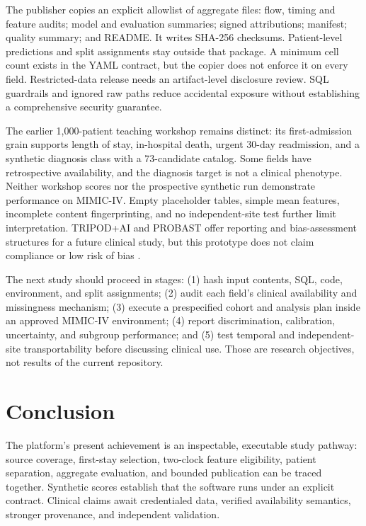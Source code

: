 \documentclass[11pt,a4paper]{article}
\begin{document}
The publisher copies an explicit allowlist of aggregate files: flow, timing and feature audits; model and evaluation summaries; signed attributions; manifest; quality summary; and README. It writes SHA-256 checksums. Patient-level predictions and split assignments stay outside that package. A minimum cell count exists in the YAML contract, but the copier does not enforce it on every field. Restricted-data release needs an artifact-level disclosure review. SQL guardrails and ignored raw paths reduce accidental exposure without establishing a comprehensive security guarantee.

The earlier 1,000-patient teaching workshop remains distinct: its first-admission grain supports length of stay, in-hospital death, urgent 30-day readmission, and a synthetic diagnosis class with a 73-candidate catalog. Some fields have retrospective availability, and the diagnosis target is not a clinical phenotype. Neither workshop scores nor the prospective synthetic run demonstrate performance on MIMIC-IV. Empty placeholder tables, simple mean features, incomplete content fingerprinting, and no independent-site test further limit interpretation. TRIPOD+AI and PROBAST offer reporting and bias-assessment structures for a future clinical study, but this prototype does not claim compliance or low risk of bias \cite{tripodai,probast}.

The next study should proceed in stages: (1) hash input contents, SQL, code, environment, and split assignments; (2) audit each field's clinical availability and missingness mechanism; (3) execute a prespecified cohort and analysis plan inside an approved MIMIC-IV environment; (4) report discrimination, calibration, uncertainty, and subgroup performance; and (5) test temporal and independent-site transportability before discussing clinical use. Those are research objectives, not results of the current repository.

\section{Conclusion}

The platform's present achievement is an inspectable, executable study pathway: source coverage, first-stay selection, two-clock feature eligibility, patient separation, aggregate evaluation, and bounded publication can be traced together. Synthetic scores establish that the software runs under an explicit contract. Clinical claims await credentialed data, verified availability semantics, stronger provenance, and independent validation.
\end{document}
